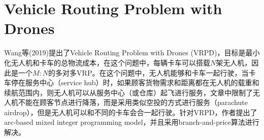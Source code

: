 \chapter{Vehicle Routing Problem with Drones}
Wang等(2019)\cite{wangVehicleRoutingProblem2019}提出了Vehicle Routing Problem with Drones (VRPD)，目标是最小化无人机和卡车的总物流成本，在这个问题中，每辆卡车可以搭载$N$架无人机，因此是一个$M:N$的多对多VRP。在这个问题中，无人机能够和卡车一起行驶，当卡车停在服务中心（service hub）时，如果顾客货物需求和距离都在无人机的载重和续航范围内，则无人机可以从服务中心（或仓库）起飞进行服务，文章中限制了无人机不能在顾客节点进行降落，而是采用类似空投的方式进行服务（parachute airdrop），但是无人机可以和不同的卡车会合一起行驶。针对VRPD，作者提出了arc-based mixed integer programming model，并且采用branch-and-price算法进行解决。

